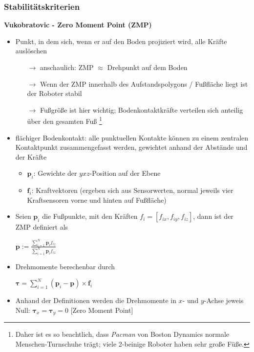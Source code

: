 \subsubsection{Stabilitätskriterien}
\textbf{Vukobratovic - Zero Moment Point (ZMP)}
\begin{itemize}
\item Punkt, in dem sich, wenn er auf den Boden projiziert wird, alle Kräfte auslöschen
\begin{itemize}
\item[$\rightarrow$] anschaulich: ZMP $\approx$ \glqq Drehpunkt\grqq{} auf dem Boden
\item[$\rightarrow$] Wenn der ZMP innerhalb des Aufstandspolygons / Fußfläche liegt ist der Roboter stabil
\item[$\rightarrow$] Fußgröße ist hier wichtig; Bodenkontaktkräfte verteilen sich anteilig über den gesamten Fuß \footnote{Daher ist es so beachtlich, dass \textit{Pacman} von Boston Dynamics normale Menschen-Turnschuhe trägt; viele 2-beinige Roboter haben sehr große Füße.}
\end{itemize}
\item flächiger Bodenkontakt: alle punktuellen Kontakte können zu einem zentralen Kontaktpunkt zusammengefasst werden, gewichtet anhand der Abstände und der Kräfte
\begin{itemize}
\item $\mathbf{p}_i$: Gewichte der $yxz$-Position auf der Ebene
\item $\mathbf{f}_i$: Kraftvektoren (ergeben sich aus Sensorwerten, normal jeweils vier Kraftsensoren vorne und hinten auf Fußfläche)
\end{itemize}
\item Seien $\mathbf{p}_i$ die Fußpunkte, mit den Kräften $f_i = [f_{ix}, f_{iy}, f_{iz}]$, dann ist der ZMP definiert als\\
\begin{center}
$\mathbf{p} := \frac{\sum_{i=1}^N \mathbf{p}_if_{iz}}{\sum_{i=1}^N \mathbf{p}_if_{iz}}$
\end{center}
\item Drehmomente berechenbar durch \\
\begin{center}
$\mathbf{\tau} = \sum_{i=1}^N (\mathbf{p}_i - \mathbf{p}) \times \mathbf{f}_i$
\end{center}
\item Anhand der Definitionen werden die Drehmomente in $x$- und $y$-Achse jeweis Null: $\mathbf{\tau}_x = \mathbf{\tau}_y = 0$ [Zero Moment Point]

\end{itemize}
